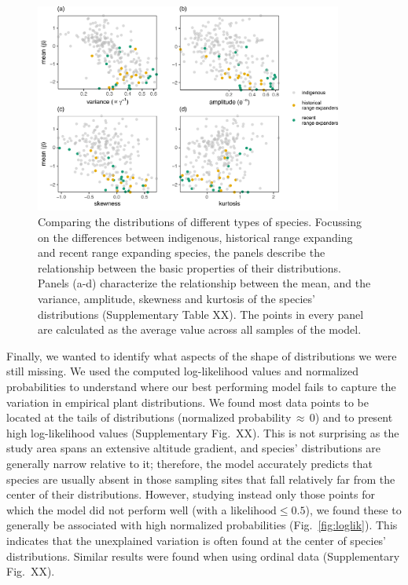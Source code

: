 \documentclass[11pt, a4paper]{article}
\begin{document}
\begin{figure}[ht]
  \centering
    \includegraphics[width=0.9\textwidth]{figures/figure3}
    	  \vspace{0.1cm}
	   \caption{Comparing the distributions of different types of species. Focussing on the differences between indigenous, historical range expanding and recent range expanding species, the panels describe the relationship between the basic properties of their distributions. Panels (a-d) characterize the relationship between the mean, and the variance, amplitude, skewness and kurtosis of the species' distributions (Supplementary Table XX). The points in every panel are calculated as the average value across all samples of the model. %
	   }
      \label{fig:pairwise}
\end{figure}

Finally, we wanted to identify what aspects of the shape of distributions we were still missing. We used the computed log-likelihood values and normalized probabilities to understand where our best performing model fails to capture the variation in empirical plant distributions. We found most data points to be located at the tails of distributions ($\text{normalized probability}\,\approx\,0$) and to present high log-likelihood values (Supplementary Fig.~XX). This is not surprising as the study area spans an extensive altitude gradient, and species' distributions are generally narrow relative to it; therefore, the model accurately predicts that species are usually absent in those sampling sites that fall relatively far from the center of their distributions. However, studying instead only those points for which the model did not perform well (with a $\text{likelihood}\leq 0.5$), we found these to generally be associated with high normalized probabilities (Fig.~\ref{fig:loglik}). This indicates that the unexplained variation is often found at the center of species' distributions. Similar results were found when using ordinal data (Supplementary Fig.~XX).
\end{document}
